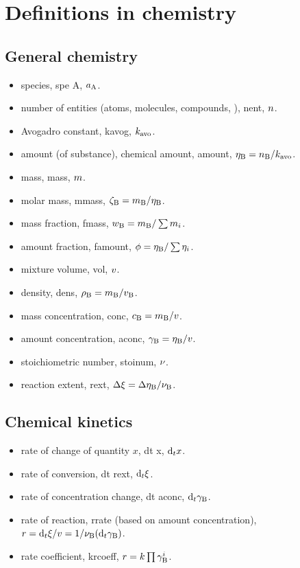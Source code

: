 \section{Definitions in chemistry}

\subsection{General chemistry}
\begin{itemize}
\item species, spe A, $a\spe A$.
\item number of entities (atoms, molecules, compounds, \etc), nent, $n$.
\item Avogadro constant, kavog, $k_\text{avo}$.
\item amount (of substance), chemical amount, amount, $\amount\spe B = \nent\spe B/\kavog$.
\item mass, mass, $m$.
\item molar mass, mmass, $\mmass\spe B = \mass\spe B/\amount\spe B$.
\item mass fraction, fmass, $\fmass\spe B = \mass\spe B/\sum\mass_i$.
\item amount fraction, famount, $\famount = \amount\spe B/\sum\amount_i$.
\item mixture volume, vol, $v$.
\item density, dens, $\dens\spe B = \mass\spe B/\vol\spe B$.
\item mass concentration, conc, $\conc\spe B = \mass\spe B/\vol$.
\item amount concentration, aconc, $\aconc\spe B = \amount\spe B/\vol$.
\item stoichiometric number, stoinum, $\nu$.
\item reaction extent, rext, $\Dx\rext = \Dx\amount\spe B/\stoinum\spe B$.
\end{itemize}


\subsection{Chemical kinetics}
\begin{itemize}
\item rate of change of quantity $x$, dt x, $\text{d}_{t} x$.
\item rate of conversion, dt rext, $\text{d}_{t}\xi$.
\item rate of concentration change, dt aconc, $\dt\aconc\spe B$.
\item rate of reaction, rrate (based on amount concentration), $\rrate = \dt\rext/\vol = 1/\stoinum\spe B(\dt\aconc\spe B)$.
\item rate coefficient, krcoeff, $\rrate = \krcoeff\prod\aconc\spe B^i$.
\end{itemize}
